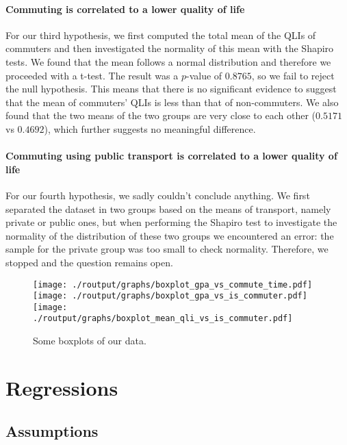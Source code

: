 \documentclass[11pt]{extarticle}
\numberwithin{table}{section}
\numberwithin{figure}{section}
\numberwithin{equation}{section}
\begin{document}
\paragraph{Commuting is correlated to a lower quality of life}
For our third hypothesis, we first computed the total mean of the QLIs of commuters and
then investigated the normality of this mean with the Shapiro tests.
We found that the mean follows a normal distribution and therefore we proceeded with a t-test.
The result was a $p$-value of $0.8765$, so we fail to reject the null hypothesis.
This means that there is no significant evidence to suggest that the mean of commuters' QLIs
is less than that of non-commuters.
We also found that the two means of the two groups are very close to each other
($0.5171$ vs $0.4692$), which further suggests no meaningful difference.

\paragraph{Commuting using public transport is correlated to a lower quality of life}
For our fourth hypothesis, we sadly couldn’t conclude anything.
We first separated the dataset in two groups based on the means of transport,
namely private or public ones, but when performing the Shapiro test to investigate the normality
of the distribution of these two groups we encountered an error:
the sample for the private group was too small to check normality.
Therefore, we stopped and the question remains open.

\begin{figure}[!ht]
	\centering
	{\texttt{[image: ./routput/graphs/boxplot\_gpa\_vs\_commute\_time.pdf]}}
	{\texttt{[image: ./routput/graphs/boxplot\_gpa\_vs\_is\_commuter.pdf]}}
	{\texttt{[image: ./routput/graphs/boxplot\_mean\_qli\_vs\_is\_commuter.pdf]}}
	\caption{Some boxplots of our data.}
\end{figure}

\section{Regressions}

\subsection{Assumptions}
\end{document}
